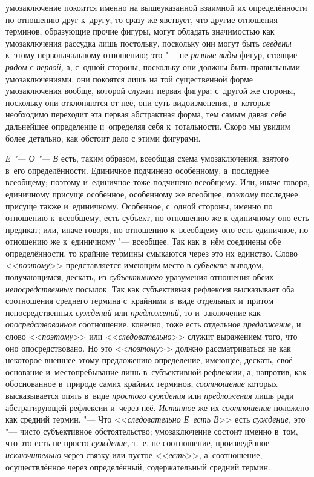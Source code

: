 умозаключение покоится именно на вышеуказанной взаимной их определённости
по отношению друг к~другу, то сразу же явствует, что другие отношения
терминов, образующие прочие фигуры, могут обладать значимостью как
умозаключения рассудка лишь постольку, поскольку они могут быть
{\em сведены} к~этому
первоначальному отношению; это "--- не
{\em разные виды} фигур,
стоящие {\em рядом} с
{\em первой,} а, с~одной
стороны, поскольку они должны быть правильными умозаключениями, они
покоятся лишь на той существенной форме умозаключения вообще, которой
служит первая фигура; с~другой же стороны, поскольку они отклоняются от
неё, они суть видоизменения, в~которые необходимо переходит эта первая
абстрактная форма, тем самым давая себе дальнейшее определение и~определяя
себя к~тотальности. Скоро мы увидим более детально, как обстоит дело с
этими фигурами.

{\em Е "--- О "--- В} есть, таким образом, всеобщая схема
умозаключения, взятого в~его определённости. Единичное подчинено
особенному, а~последнее всеобщему; поэтому и~единичное тоже подчинено
всеобщему. Или, иначе говоря, единичному присуще особенное, особенному же
всеобщее; {\em поэтому}
последнее присуще также и~единичному. Особенное, с~одной
стороны, именно по отношению к~всеобщему, есть субъект, по отношению же к
единичному оно есть предикат; или, иначе говоря, по отношению к~всеобщему
оно есть единичное, по отношению же к~единичному "--- всеобщее.
Так как в~нём соединены обе определённости, то крайние термины смыкаются
через это их единство. Слово
<<{\em поэтому}>>
представляется имеющим место в
{\em субъекте} выводом,
получающимся, дескать, из
{\em субъективного}
уразумения отношения обеих
{\em непосредственных}
посылок. Так как субъективная рефлексия высказывает оба
соотношения среднего термина с~крайними в~виде отдельных и~притом
непосредственных {\em суждений}
или {\em предложений,}
то и~заключение как
{\em опосредствованное}
соотношение, конечно, тоже есть отдельное
{\em предложение,} и
слово <<{\em поэтому}>> или
<<{\em следовательно}>>
служит выражением того, что оно опосредствовано. Но это
<<{\em поэтому}>> должно
рассматриваться не как некоторое внешнее этому предложению определение,
имеющее, дескать, своё основание и~местопребывание лишь в~субъективной
рефлексии, а, напротив, как обоснованное в~природе самих крайних терминов,
{\em соотношение} которых
высказывается опять в~виде {\em простого
суждения} или
{\em предложения} лишь
ради абстрагирующей рефлексии и~через неё.
{\em Истинное} же их
{\em соотношение}
положено как средний термин. "--- Что
<<{\em следовательно Е~есть В}>>
есть {\em суждение,}
это "--- чисто субъективное обстоятельство;
умозаключение состоит именно в~том, что это есть не просто
{\em суждение,} т.~е. не
соотношение, произведённое
{\em исключительно} через
связку или пустое <<{\em есть}>>,
а~соотношение, осуществлённое через определённый,
содержательный средний термин.

